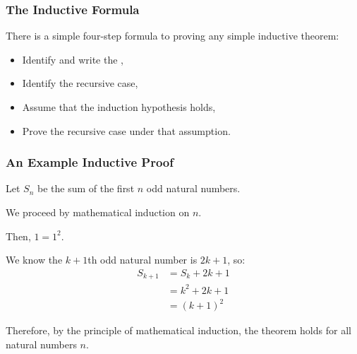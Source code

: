 \documentclass[aspectratio=169]{beamer}
\begin{document}
\begin{frame}[fragile]
  \frametitle{The Inductive Formula}

  There is a simple four-step formula to proving any simple inductive theorem:

  \pause
  \vspace{5pt}

  \begin{itemize}
    \item Identify and write the , \pause
    \item Identify the recursive case, \pause
    \item Assume that the induction hypothesis holds, \pause
    \item Prove the recursive case under that assumption. \pause
  \end{itemize}

  \pause
  \vspace{\fill}

\end{frame}

\begin{frame}[fragile]
  \frametitle{An Example Inductive Proof}

  { \small
  Let $S_n$ be the sum of the first $n$ odd natural numbers.

  \pause
  \vspace{\fill}


  \pause
  \vspace{\fill}

  We proceed by mathematical induction on $n$.

  \vspace{\fill}

  Then, $1 = 1^2$.

  \vspace{\fill}



  \vspace{\fill}

  We know the $k + 1$th odd natural number is $2k + 1$, so:
  \begin{align*}
    S_{k + 1} &= S_k + 2k + 1 \\
              &= k^2 + 2k + 1 \\
              &= (k + 1)^2
  \end{align*}

  Therefore, by the principle of mathematical induction, the theorem holds
  for all natural numbers $n$.
  }
\end{frame}
\end{document}
